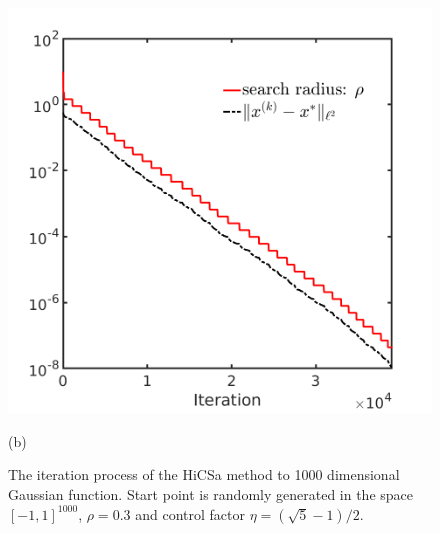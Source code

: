\documentclass[final,1p,times]{elsarticle}
\begin{document}
\begin{figure}[!htbp]
\begin{minipage}[b]{0.5\linewidth}
{	  \includegraphics[scale=0.25]{../figures/gauss1000D_dist.png}
	  }
	\centerline{(b) }
	\end{minipage}
	  \caption{The iteration process of the HiCSa method to 1000
	  dimensional Gaussian function. 
	  Start point is randomly generated in the space $[-1,
	  1]^{1000}$, $\rho=0.3$ and control factor
	  $\eta=(\sqrt{5}-1)/2$.} 
	  \label{fig:gauss:1000D}
\end{figure}
\end{document}
